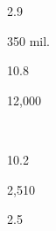 \begin{description}[font=\normalfont,style=nextline]
\item[\langnameArabic] 
 \begin{multicols}{2}\begin{description}[font=\normalfont\itshape,noitemsep] 
 \item[] 
 \item[\pbnumberabbr] 2.9 
 \item[\family] \famAfroasiatic 
 \item[]
\item[\nativespeakers] 350 mil. 
 \item[\region] \regionAsia\EnumComma\regionAfrica 
 \end{description}\end{multicols}

\pagebreak
\item[\langnameAralle] 
 \begin{multicols}{2}\begin{description}[font=\normalfont\itshape,noitemsep] 
 \item[] 
 \item[\pbnumberabbr] 10.8 
 \item[\family] \famAustronesian 
 \item[]
\item[\nativespeakers] 12,000 
 \item[\region] \regionWSulawesi\ \Brackets{\regionIndonesia} 
 \end{description}\end{multicols}
\item[\langnameArawak] 
 \begin{multicols}{2}\begin{description}[font=\normalfont\itshape,noitemsep] 
 \item[] 
 \item[\pbnumberabbr] 10.2 
 \item[\family] \famArawakan 
 \item[]
\item[\nativespeakers] 2,510 
 \item[\region] \regionSouthAmerica 
 \end{description}\end{multicols}
\item[\langnameArmenian] 
 \begin{multicols}{2}\begin{description}[font=\normalfont\itshape,noitemsep] 
 \item[] 
 \item[\pbnumberabbr] 2.5 

\end{description}
\end{multicols}
\end{description}
